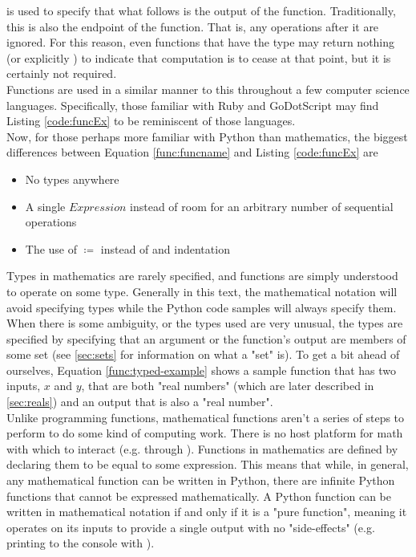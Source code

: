  is used to specify that what follows is the output of the function. Traditionally, this is also the endpoint of the function. That is, any operations after it are ignored. For this reason, even functions that have the  type may return nothing (or explicitly ) to indicate that computation is to cease at that point, but it is certainly not required. \\
Functions are used in a similar manner to this throughout a few computer science languages. Specifically, those familiar with Ruby and GoDotScript may find Listing
\ref{code:funcEx} to be reminiscent of those languages.\\

Now, for those perhaps more familiar with Python than mathematics, the biggest differences between Equation \ref{func:funcname} and Listing \ref{code:funcEx} are
\begin{itemize}
	\item No types anywhere
	\item A single $Expression$ instead of room for an arbitrary number of sequential operations
	\item The use of $\coloneqq$ instead of  and indentation
\end{itemize}
Types in mathematics are rarely specified, and functions are simply understood to operate on some type. Generally in this text, the mathematical notation will avoid specifying types while the Python code samples will always specify them. When there is some ambiguity, or the types used are very unusual, the types are specified by specifying that an argument or the function's output are members of some set (see \ref{sec:sets} for information on what a "set" is). To get a bit ahead of ourselves, Equation \ref{func:typed-example} shows a sample function that has two inputs, $x$ and $y$, that are both "real numbers" (which are later described in \ref{sec:reals}) and an output that is also a "real number".\\
Unlike programming functions, mathematical functions aren't a series of steps to perform to do some kind of computing work. There is no host platform for math with which to interact (e.g. through ). Functions in mathematics are defined by declaring them to be equal to some expression. This means that while, in general, any mathematical function can be written in Python, there are infinite Python functions that cannot be expressed mathematically. A Python function can be written in mathematical notation if and only if it is a "pure function", meaning it operates on its inputs to provide a single output with no "side-effects" (e.g. printing to the console with ).\\
